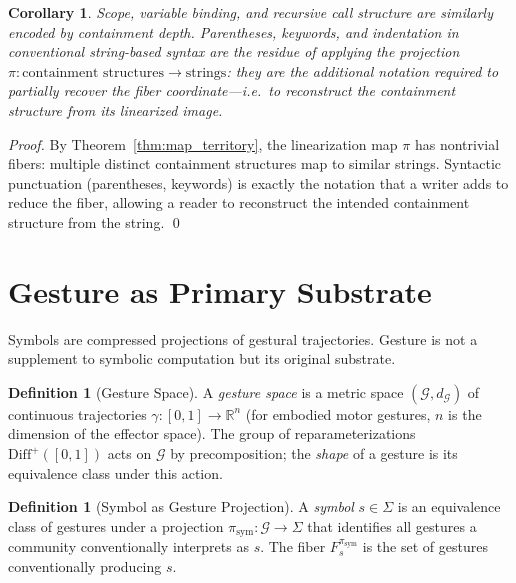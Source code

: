 \documentclass[12pt, a4paper, twoside]{article}
\theoremstyle{plain}
\newtheorem{corollary}[theorem]{Corollary}
\theoremstyle{definition}
\newtheorem{definition}[theorem]{Definition}
\theoremstyle{remark}
\newcommand{\Proj}{\pi}
\newcommand{\Fibover}[2]{F^{#1}_{#2}}
\begin{document}
\begin{corollary}
Scope, variable binding, and recursive call structure are similarly encoded by
containment depth. Parentheses, keywords, and indentation in conventional
string-based syntax are the residue of applying the projection
$\Proj: \text{containment structures} \to \text{strings}$: they are the
additional notation required to partially recover the fiber coordinate---i.e.\
to reconstruct the containment structure from its linearized image.
\end{corollary}

\begin{proof}
By Theorem~\ref{thm:map_territory}, the linearization map $\Proj$ has
nontrivial fibers: multiple distinct containment structures map to similar
strings. Syntactic punctuation (parentheses, keywords) is exactly the notation
that a writer adds to reduce the fiber, allowing a reader to reconstruct the
intended containment structure from the string.
\qed
\end{proof}

\section{Gesture as Primary Substrate}
\label{sec:gesture}

Symbols are compressed projections of gestural trajectories. Gesture is not
a supplement to symbolic computation but its original substrate.

\begin{definition}[Gesture Space]
A \emph{gesture space} is a metric space $(\mathcal{G}, d_{\mathcal{G}})$ of
continuous trajectories $\gamma: [0,1] \to \mathbb{R}^n$ (for embodied motor
gestures, $n$ is the dimension of the effector space). The group of
reparameterizations $\mathrm{Diff}^+([0,1])$ acts on $\mathcal{G}$ by
precomposition; the \emph{shape} of a gesture is its equivalence class under
this action.
\end{definition}

\begin{definition}[Symbol as Gesture Projection]
A \emph{symbol} $s \in \Sigma$ is an equivalence class of gestures under a
projection $\Proj_{\mathrm{sym}}: \mathcal{G} \to \Sigma$ that identifies all
gestures a community conventionally interprets as $s$. The fiber
$\Fibover{\Proj_{\mathrm{sym}}}{s}$ is the set of gestures conventionally
producing $s$.
\end{definition}
\end{document}
